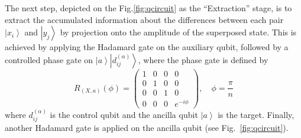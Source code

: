 \documentclass[pra,showkeys,twocolumn,showpacs,aps,10pt]{revtex4-1}
\begin{document}
The next step, depicted on the Fig.\ref{fig:qcircuit} as the ``Extraction'' stage, is to extract the accumulated information about the differences between each pair $\left| x_i \right\rangle$ and $\left| y_j \right\rangle$ by projection onto the amplitude of the superposed state. This is achieved by applying the Hadamard gate on the auxiliary qubit, followed by a controlled phase gate on $\left|a\right\rangle \left|d_{ij}^{(\alpha)}\right\rangle$, where the phase gate is defined by
\begin{equation}
    \label{eq:controled_phase_rotation}
    R_{(X,a)}(\phi) =
    \begin{pmatrix}
        1 & 0 & 0 & 0 \\
        0 & 1 & 0 & 0 \\
        0 & 0 & 1 & 0 \\
        0 & 0 & 0 & e^{-i\phi}
    \end{pmatrix} ,
    \quad \phi = \frac{\pi}{n}
\end{equation}
%
where $d_{ij}^{(\alpha)}$ is the control qubit and the ancilla qubit $\left| a \right\rangle$ is the target. Finally, another Hadamard gate is applied on the ancilla qubit (see Fig.~\ref{fig:qcircuit}).
\end{document}
